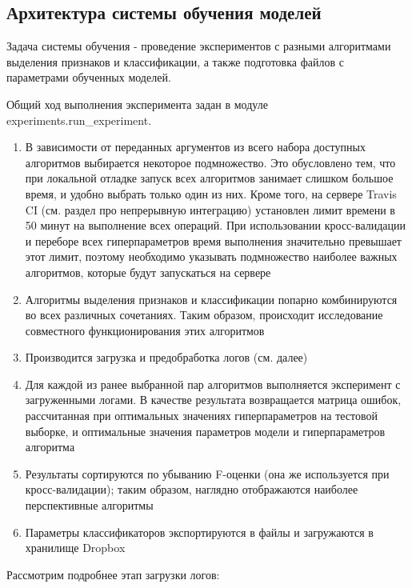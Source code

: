 \subsection{Архитектура системы обучения моделей}

Задача системы обучения - проведение экспериментов с разными алгоритмами выделения признаков и классификации, а также подготовка файлов с параметрами обученных моделей.

Общий ход выполнения эксперимента задан в модуле experiments.run\_experiment. 

\begin{enumerate}
\item В зависимости от переданных аргументов из всего набора доступных алгоритмов выбирается некоторое подмножество. Это обусловлено тем, что при локальной отладке запуск всех алгоритмов занимает слишком большое время, и удобно выбрать только один из них. Кроме того, на сервере Travis CI (см. раздел про непрерывную интеграцию) установлен лимит времени в 50 минут на выполнение всех операций. При использовании кросс-валидации и переборе всех гиперпараметров время выполнения значительно превышает этот лимит, поэтому необходимо указывать подмножество наиболее важных алгоритмов, которые будут запускаться на сервере
\item Алгоритмы выделения признаков и классификации попарно комбинируются во всех различных сочетаниях. Таким образом, происходит исследование совместного функционирования этих алгоритмов
\item Производится загрузка и предобработка логов (см. далее)
\item Для каждой из ранее выбранной пар алгоритмов выполняется эксперимент с загруженными логами. В качестве результата возвращается матрица ошибок, рассчитанная при оптимальных значениях гиперпараметров на тестовой выборке, и оптимальные значения параметров модели и гиперпараметров алгоритма
\item Результаты сортируются по убыванию F-оценки (она же используется при кросс-валидации); таким образом, наглядно отображаются наиболее перспективные алгоритмы
\item Параметры классификаторов экспортируются в файлы и загружаются в хранилище Dropbox 
\end{enumerate}

Рассмотрим подробнее этап загрузки логов:

